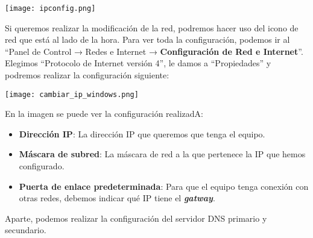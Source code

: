 \begin{center}
    \texttt{[image: ipconfig.png]}
\end{center}


Si queremos realizar la modificación de la red, podremos hacer uso del icono de red que está al lado de la hora. Para ver toda la configuración, podemos ir al “Panel de Control → Redes e Internet → \textbf{Configuración de Red e Internet}”. Elegimos “Protocolo de Internet versión 4”, le damos a “Propiedades” y podremos realizar la configuración siguiente:


\begin{center}
    \texttt{[image: cambiar\_ip\_windows.png]}
\end{center}


En la imagen se puede ver la configuración realizadA:
\begin{itemize}
    \item \textbf{Dirección IP}: La dirección IP que queremos que tenga el equipo.
    \item \textbf{Máscara de subred}: La máscara de red a la que pertenece la IP que hemos configurado.
    \item \textbf{Puerta de enlace predeterminada}: Para que el equipo tenga conexión con otras redes, debemos indicar qué IP tiene el \textbf{\textit{gatway}}.
\end{itemize}

Aparte, podemos realizar la configuración del servidor DNS primario y secundario.